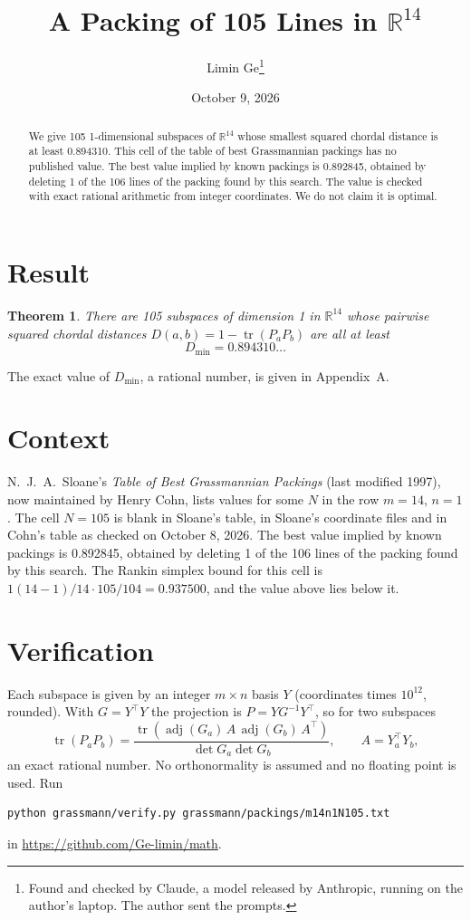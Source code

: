 \documentclass[11pt,a4paper]{article}
\title{A Packing of 105 Lines in $\mathbb{R}^{14}$}
\author{Limin Ge\thanks{Found and checked by Claude, a model released by Anthropic, running on the author's laptop. The author sent the prompts.}}
\date{October 9, 2026}
\newtheorem*{theorem}{Theorem}
\begin{document}
\maketitle
\begin{abstract}
We give 105 1-dimensional subspaces of $\mathbb{R}^{14}$ whose smallest squared chordal distance is at least 0.894310. This cell of the table of best Grassmannian packings has no published value. The best value implied by known packings is 0.892845, obtained by deleting 1 of the 106 lines of the packing found by this search. The value is checked with exact rational arithmetic from integer coordinates. We do not claim it is optimal.
\end{abstract}

\section{Result}
\begin{theorem}
There are 105 subspaces of dimension 1 in $\mathbb{R}^{14}$ whose pairwise squared chordal distances $D(a,b) = 1 - \operatorname{tr}(P_aP_b)$ are all at least
\[ D_{\min} = 0.894310\ldots \]
\end{theorem}
The exact value of $D_{\min}$, a rational number, is given in Appendix~A.


\section{Context}
N.~J.~A.~Sloane's \emph{Table of Best Grassmannian Packings} (last modified 1997), now maintained by Henry Cohn, lists values for some $N$ in the row $m=14$, $n=1$. The cell $N=105$ is blank in Sloane's table, in Sloane's coordinate files and in Cohn's table as checked on October 8, 2026. The best value implied by known packings is 0.892845, obtained by deleting 1 of the 106 lines of the packing found by this search. The Rankin simplex bound for this cell is $1(14-1)/14\cdot 105/104 = 0.937500$, and the value above lies below it.


\section{Verification}
Each subspace is given by an integer $m\times n$ basis $Y$ (coordinates times $10^{12}$, rounded). With $G=Y^\top Y$ the projection is $P=YG^{-1}Y^\top$, so for two subspaces
\[ \operatorname{tr}(P_aP_b)=\frac{\operatorname{tr}(\operatorname{adj}(G_a)\,A\,\operatorname{adj}(G_b)\,A^\top)}{\det G_a\det G_b},\qquad A=Y_a^\top Y_b, \]
an exact rational number. No orthonormality is assumed and no floating point is used. Run
\begin{verbatim}
python grassmann/verify.py grassmann/packings/m14n1N105.txt
\end{verbatim}
in \url{https://github.com/Ge-limin/math}.
\end{document}

